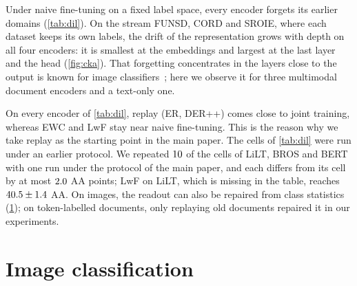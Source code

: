 \begin{table}[t]
\centering\scriptsize
\setlength{\tabcolsep}{3pt}
\caption{\textbf{Drift and its remedy on four encoders} (DIL, AA, mean $\pm$ s.d.; earlier protocol$^\dagger$; ``--'': not run).}
\label{tab:dil}
\resizebox{\linewidth}{!}{}
\end{table}


 Under naive fine-tuning on a fixed label space, every encoder forgets its earlier domains (\cref{tab:dil}). On the stream FUNSD, CORD and SROIE, where each dataset keeps its own labels, the drift of the representation grows with depth on all four encoders: it is smallest at the embeddings and largest at the last layer and the head (\cref{fig:cka}). That forgetting concentrates in the layers close to the output is known for image classifiers~\citep{ramasesh2021anatomy}; here we observe it for three multimodal document encoders and a text-only one.

 On every encoder of \cref{tab:dil}, replay (ER, DER++) comes close to joint training, whereas EWC and LwF stay near naive fine-tuning. This is the reason why we take replay as the starting point in the main paper. The cells of \cref{tab:dil} were run under an earlier protocol. We repeated $10$ of the cells of LiLT, BROS and BERT with one run under the protocol of the main paper, and each differs from its cell by at most $2.0$ AA points; LwF on LiLT, which is missing in the table, reaches $40.5\pm1.4$ AA. On images, the readout can also be repaired from class statistics (\cref{app:image}); on token-labelled documents, only replaying old documents repaired it in our experiments.

\section{Image classification}
\label{app:image}


\begin{table}[t]
\centering\small
\setlength{\tabcolsep}{3pt}
\caption{\textbf{Image class-incremental learning} with ViT-B/16 (AA, mean $\pm$ s.d.). Bold: best of each column, Joint training aside; underlined: our best when a baseline is best.}
\label{tab:image}
\resizebox{\linewidth}{!}{}
\end{table}

